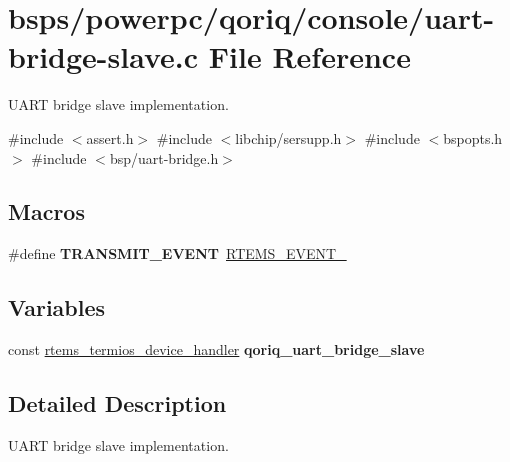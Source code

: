 \hypertarget{uart-bridge-slave_8c}{}\section{bsps/powerpc/qoriq/console/uart-\/bridge-\/slave.c File Reference}
\label{uart-bridge-slave_8c}


U\+A\+RT bridge slave implementation.  


{\ttfamily \#include $<$assert.\+h$>$}\newline
{\ttfamily \#include $<$libchip/sersupp.\+h$>$}\newline
{\ttfamily \#include $<$bspopts.\+h$>$}\newline
{\ttfamily \#include $<$bsp/uart-\/bridge.\+h$>$}\newline
\subsection*{Macros}
\begin{DoxyCompactItemize}
\item 
\mbox{\label{uart-bridge-slave_8c_afdc4093304d7f6a402c1917f8d7b191a}} 
\#define {\bfseries T\+R\+A\+N\+S\+M\+I\+T\+\_\+\+E\+V\+E\+NT}~\mbox{\hyperlink{group__ClassicEventSet_gadab2e575c5b836fcd51a2d50443fefea}{R\+T\+E\+M\+S\+\_\+\+E\+V\+E\+N\+T\+\_}}
\end{DoxyCompactItemize}
\subsection*{Variables}
\begin{DoxyCompactItemize}
\item 
const \mbox{\hyperlink{structrtems__termios__device__handler}{rtems\+\_\+termios\+\_\+device\+\_\+handler}} {\bfseries qoriq\+\_\+uart\+\_\+bridge\+\_\+slave}
\end{DoxyCompactItemize}


\subsection{Detailed Description}
U\+A\+RT bridge slave implementation. 

